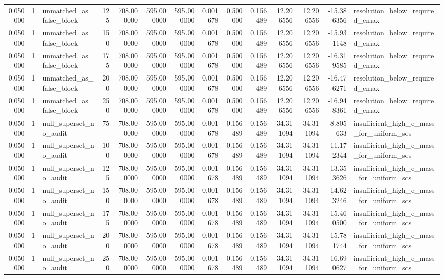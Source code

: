 \begin{tabular}{rrlrrrrrrrrrrl}
0.050000 & 1 & unmatched_as_false_block & 125 & 708.000000 & 595.000000 & 595.000000 & 0.001678 & 0.500000 & 0.156489 & 12.206556 & 12.206556 & -15.386356 & resolution_below_required_emax \\
0.050000 & 1 & unmatched_as_false_block & 150 & 708.000000 & 595.000000 & 595.000000 & 0.001678 & 0.500000 & 0.156489 & 12.206556 & 12.206556 & -15.931148 & resolution_below_required_emax \\
0.050000 & 1 & unmatched_as_false_block & 175 & 708.000000 & 595.000000 & 595.000000 & 0.001678 & 0.500000 & 0.156489 & 12.206556 & 12.206556 & -16.319585 & resolution_below_required_emax \\
0.050000 & 1 & unmatched_as_false_block & 200 & 708.000000 & 595.000000 & 595.000000 & 0.001678 & 0.500000 & 0.156489 & 12.206556 & 12.206556 & -16.476271 & resolution_below_required_emax \\
0.050000 & 1 & unmatched_as_false_block & 250 & 708.000000 & 595.000000 & 595.000000 & 0.001678 & 0.500000 & 0.156489 & 12.206556 & 12.206556 & -16.948361 & resolution_below_required_emax \\
0.050000 & 1 & null_superset_no_audit & 75 & 708.000000 & 595.000000 & 595.000000 & 0.001678 & 0.156489 & 0.156489 & 34.311094 & 34.311094 & -8.805633 & insufficient_high_e_mass_for_uniform_scs \\
0.050000 & 1 & null_superset_no_audit & 100 & 708.000000 & 595.000000 & 595.000000 & 0.001678 & 0.156489 & 0.156489 & 34.311094 & 34.311094 & -11.172344 & insufficient_high_e_mass_for_uniform_scs \\
0.050000 & 1 & null_superset_no_audit & 125 & 708.000000 & 595.000000 & 595.000000 & 0.001678 & 0.156489 & 0.156489 & 34.311094 & 34.311094 & -13.353626 & insufficient_high_e_mass_for_uniform_scs \\
0.050000 & 1 & null_superset_no_audit & 150 & 708.000000 & 595.000000 & 595.000000 & 0.001678 & 0.156489 & 0.156489 & 34.311094 & 34.311094 & -14.623246 & insufficient_high_e_mass_for_uniform_scs \\
0.050000 & 1 & null_superset_no_audit & 175 & 708.000000 & 595.000000 & 595.000000 & 0.001678 & 0.156489 & 0.156489 & 34.311094 & 34.311094 & -15.460500 & insufficient_high_e_mass_for_uniform_scs \\
0.050000 & 1 & null_superset_no_audit & 200 & 708.000000 & 595.000000 & 595.000000 & 0.001678 & 0.156489 & 0.156489 & 34.311094 & 34.311094 & -15.781744 & insufficient_high_e_mass_for_uniform_scs \\
0.050000 & 1 & null_superset_no_audit & 250 & 708.000000 & 595.000000 & 595.000000 & 0.001678 & 0.156489 & 0.156489 & 34.311094 & 34.311094 & -16.690627 & insufficient_high_e_mass_for_uniform_scs \\

\end{tabular}
